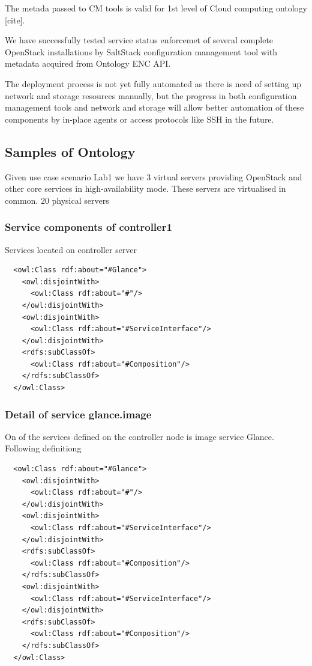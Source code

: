 The metada passed to CM tools is valid for 1st level of Cloud computing ontology [cite].

We have successfully tested service status enforcemet of several complete OpenStack installations by SaltStack configuration management tool with metadata acquired from Ontology ENC API.

The deployment process is not yet fully automated as there is need of setting up network and storage resources manually, but the progress in both configuration management tools and network and storage will allow better automation of these components by in-place agents or access protocols like SSH in the future.

\subsection{Samples of Ontology}

Given use case scenario Lab1 we have 3 virtual servers providing OpenStack and other core services in high-availability mode. These servers are virtualised in common. 20 physical servers  

\subsubsection{Service components of controller1}

Services located on controller server

\begin{lstlisting}
  <owl:Class rdf:about="#Glance">
    <owl:disjointWith>
      <owl:Class rdf:about="#"/>
    </owl:disjointWith>
    <owl:disjointWith>
      <owl:Class rdf:about="#ServiceInterface"/>
    </owl:disjointWith>
    <rdfs:subClassOf>
      <owl:Class rdf:about="#Composition"/>
    </rdfs:subClassOf>
  </owl:Class>
\end{lstlisting}

\subsubsection{Detail of service glance.image}

On of the services defined on the controller node is image service Glance. Following definitiong


\begin{lstlisting}
  <owl:Class rdf:about="#Glance">
    <owl:disjointWith>
      <owl:Class rdf:about="#"/>
    </owl:disjointWith>
    <owl:disjointWith>
      <owl:Class rdf:about="#ServiceInterface"/>
    </owl:disjointWith>
    <rdfs:subClassOf>
      <owl:Class rdf:about="#Composition"/>
    </rdfs:subClassOf>
    <owl:disjointWith>
      <owl:Class rdf:about="#ServiceInterface"/>
    </owl:disjointWith>
    <rdfs:subClassOf>
      <owl:Class rdf:about="#Composition"/>
    </rdfs:subClassOf>
  </owl:Class>
\end{lstlisting}

